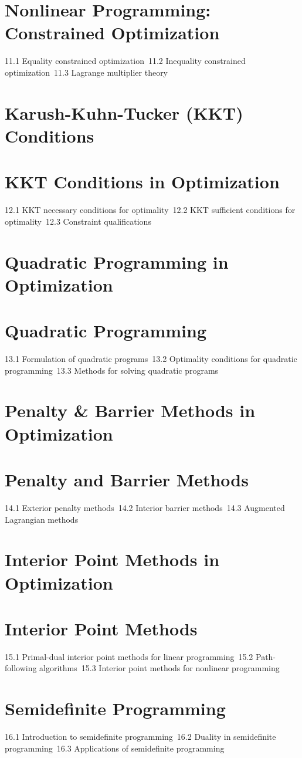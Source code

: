 \section{Nonlinear Programming: Constrained Optimization}
11.1 Equality constrained optimization\
11.2 Inequality constrained optimization\
11.3 Lagrange multiplier theory\
\section{Karush-Kuhn-Tucker (KKT) Conditions}
\section{KKT Conditions in Optimization}
12.1 KKT necessary conditions for optimality\
12.2 KKT sufficient conditions for optimality\
12.3 Constraint qualifications\
\section{Quadratic Programming in Optimization}
\section{Quadratic Programming}
13.1 Formulation of quadratic programs\
13.2 Optimality conditions for quadratic programming\
13.3 Methods for solving quadratic programs\
\section{Penalty \& Barrier Methods in Optimization}
\section{Penalty and Barrier Methods}
14.1 Exterior penalty methods\
14.2 Interior barrier methods\
14.3 Augmented Lagrangian methods\
\section{Interior Point Methods in Optimization}
\section{Interior Point Methods}
15.1 Primal-dual interior point methods for linear programming\
15.2 Path-following algorithms\
15.3 Interior point methods for nonlinear programming\
\section{Semidefinite Programming}
16.1 Introduction to semidefinite programming\
16.2 Duality in semidefinite programming\
16.3 Applications of semidefinite programming\
